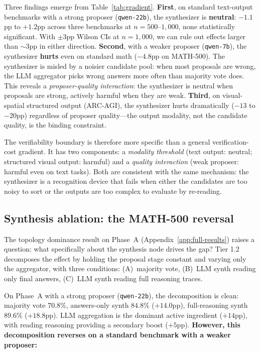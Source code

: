 \documentclass[11pt]{amsart}
\newcommand\1{{\mathds{1}}}
\theoremstyle{definition}
\theoremstyle{remark}
\numberwithin{equation}{section}
\begin{document}
Three findings emerge from Table~\ref{tab:gradient}.
\textbf{First}, on standard text-output benchmarks with a strong proposer (\texttt{qwen-22b}), the synthesizer is \textbf{neutral}: $-1.1$pp to $+1.2$pp across three benchmarks at $n\!=\!500$--$1{,}000$, none statistically significant.
With $\pm 3$pp Wilson CIs at $n\!=\!1{,}000$, we can rule out effects larger than $\sim\!3$pp in either direction.
\textbf{Second}, with a weaker proposer (\texttt{qwen-7b}), the synthesizer \textbf{hurts} even on standard math ($-4.8$pp on MATH-500).
The synthesizer is misled by a noisier candidate pool: when most proposals are wrong, the LLM aggregator picks wrong answers more often than majority vote does.
This reveals a \emph{proposer-quality interaction}: the synthesizer is neutral when proposals are strong, actively harmful when they are weak.
\textbf{Third}, on visual-spatial structured output (ARC-AGI), the synthesizer hurts dramatically ($-13$ to $-20$pp) regardless of proposer quality---the output modality, not the candidate quality, is the binding constraint.

The verifiability boundary is therefore more specific than a general verification-cost gradient.
It has two components: a \emph{modality threshold} (text output: neutral; structured visual output: harmful) and a \emph{quality interaction} (weak proposer: harmful even on text tasks).
Both are consistent with the same mechanism: the synthesizer is a recognition device that fails when either the candidates are too noisy to sort or the outputs are too complex to evaluate by re-reading.

\subsection{Synthesis ablation: the MATH-500 reversal}\label{sec:synthesis-ablation}

The topology dominance result on Phase~A (Appendix~\ref{app:full-results}) raises a question: what specifically about the synthesis node drives the gap?
Tier 1.2 decomposes the effect by holding the proposal stage constant and varying only the aggregator, with three conditions: (A)~majority vote, (B)~LLM synth reading only final answers, (C)~LLM synth reading full reasoning traces.

On Phase~A with a strong proposer (\texttt{qwen-22b}), the decomposition is clean: majority vote $70.8\%$, answers-only synth $84.8\%$ ($+14.0$pp), full-reasoning synth $89.6\%$ ($+18.8$pp).
LLM aggregation is the dominant active ingredient ($+14$pp), with reading reasoning providing a secondary boost ($+5$pp).
\textbf{However, this decomposition reverses on a standard benchmark with a weaker proposer:}
\end{document}
